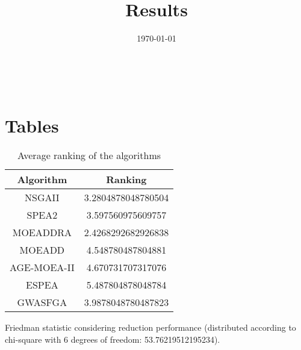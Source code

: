 \documentclass{article}
\title{Results}
\author{}
\date{\today}
\begin{document}
\oddsidemargin 0in \topmargin 0in\maketitle
\
\section{Tables}
\begin{table}[!htp]
\centering
\caption{Average ranking of the algorithms}
\begin{tabular}{c|c}
Algorithm&Ranking\\
\hline
NSGAII&3.2804878048780504\\
SPEA2&3.597560975609757\\
MOEADDRA&2.4268292682926838\\
MOEADD&4.548780487804881\\
AGE-MOEA-II&4.670731707317076\\
ESPEA&5.487804878048784\\
GWASFGA&3.9878048780487823\\
\end{tabular}
\end{table}


Friedman statistic considering reduction performance (distributed according to chi-square with 6 degrees of freedom: 53.76219512195234).
\end{document}

